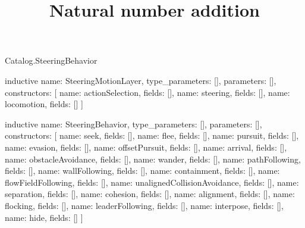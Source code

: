 \begin{lexlean}{Catalog.SteeringBehavior}
\title{Natural number addition}
\begin{semanticmodule}
inductive{
  name: SteeringMotionLayer,
  type_parameters: [],
  parameters: [],
  constructors: [
    {name: actionSelection, fields: []},
    {name: steering, fields: []},
    {name: locomotion, fields: []}
  ]
}

inductive{
  name: SteeringBehavior,
  type_parameters: [],
  parameters: [],
  constructors: [
    {name: seek, fields: []},
    {name: flee, fields: []},
    {name: pursuit, fields: []},
    {name: evasion, fields: []},
    {name: offsetPursuit, fields: []},
    {name: arrival, fields: []},
    {name: obstacleAvoidance, fields: []},
    {name: wander, fields: []},
    {name: pathFollowing, fields: []},
    {name: wallFollowing, fields: []},
    {name: containment, fields: []},
    {name: flowFieldFollowing, fields: []},
    {name: unalignedCollisionAvoidance, fields: []},
    {name: separation, fields: []},
    {name: cohesion, fields: []},
    {name: alignment, fields: []},
    {name: flocking, fields: []},
    {name: leaderFollowing, fields: []},
    {name: interpose, fields: []},
    {name: hide, fields: []}
  ]
}
\end{semanticmodule}
\end{lexlean}
